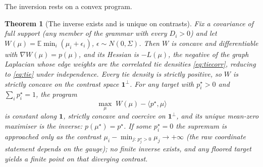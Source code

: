 \documentclass[11pt]{article}
\newtheorem{theorem}{Theorem}
\newcommand{\E}{\mathbb{E}}
\begin{document}
The inversion rests on a convex program.

\begin{theorem}[The inverse exists and is unique on contrasts]\label{thm:inverse}
Fix a covariance of full support (any member of the grammar with every
$D_i>0$) and let $W(\mu)=\E\min_i(\mu_i+\epsilon_i)$,
$\epsilon\sim N(0,\Sigma)$. Then $W$ is concave and differentiable with
$\nabla W(\mu)=p(\mu)$, and its Hessian is $-L(\mu)$, the negative of the
graph Laplacian whose edge weights are the correlated tie densities
\eqref{eq:tiecorr}, reducing to \eqref{eq:tie} under independence.
Every tie density is strictly positive, so $W$ is strictly concave on the
contrast space $\mathbf{1}^{\perp}$. For any target with $p^{\star}_i>0$
and $\sum_i p^{\star}_i=1$, the program
\[
\max_{\mu}\; W(\mu)-\langle p^{\star},\mu\rangle
\]
is constant along $\mathbf{1}$, strictly concave and coercive on
$\mathbf{1}^{\perp}$, and its unique mean-zero maximiser is the inverse:
$p(\mu^{\star})=p^{\star}$. If some $p^{\star}_i=0$ the supremum is
approached only as the contrast
$\mu_i-\min_{j:\,p^{\star}_j>0}\mu_j\to+\infty$ (the raw coordinate
statement depends on the gauge); no finite inverse exists, and any
floored target yields a finite point on that diverging contrast.
\end{theorem}
\end{document}
